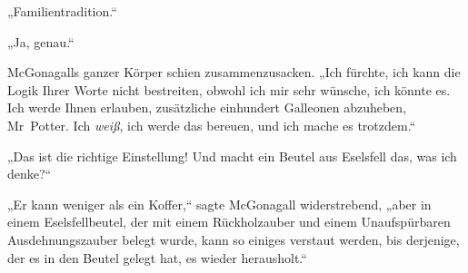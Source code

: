 „Familientradition.“

„Ja, genau.“

McGonagalls ganzer Körper schien zusammenzusacken. „Ich fürchte, ich kann die Logik Ihrer Worte nicht bestreiten, obwohl ich mir sehr wünsche, ich könnte es. Ich werde Ihnen erlauben, zusätzliche einhundert Galleonen abzuheben, Mr~Potter. Ich \emph{weiß}, ich werde das bereuen, und ich mache es trotzdem.“

„Das ist die richtige Einstellung! Und macht ein Beutel aus Eselsfell das, was ich denke?“

„Er kann weniger als ein Koffer,“ sagte McGonagall widerstrebend, „aber in einem Eselsfellbeutel, der mit einem Rückholzauber und einem Unaufspürbaren Ausdehnungszauber belegt wurde, kann so einiges verstaut werden, bis derjenige, der es in den Beutel gelegt hat, es wieder herausholt.“

